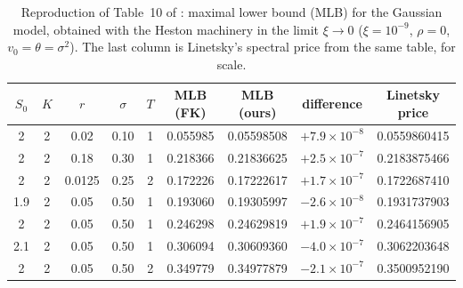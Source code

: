 \begin{table}[t]
\centering
\caption{Reproduction of Table~10 of \citet{FusaiKyriakou2016}: maximal lower bound (MLB) for the
Gaussian model, obtained with the Heston machinery in the limit $\xi\to0$ ($\xi=10^{-9}$, $\rho=0$,
$v_0=\theta=\sigma^2$). The last column is Linetsky's spectral price from the same table, for scale.}
\label{tab:fk10}
\footnotesize\setlength{\tabcolsep}{4.5pt}
\begin{tabular}{ccccc cccc}
\toprule
$S_0$ & $K$ & $r$ & $\sigma$ & $T$ & MLB (FK) & MLB (ours) & difference & Linetsky price\\
\midrule
2   & 2 & 0.02   & 0.10 & 1 & 0.055985 & 0.05598508 & $+7.9\times10^{-8}$ & 0.0559860415\\
2   & 2 & 0.18   & 0.30 & 1 & 0.218366 & 0.21836625 & $+2.5\times10^{-7}$ & 0.2183875466\\
2   & 2 & 0.0125 & 0.25 & 2 & 0.172226 & 0.17222617 & $+1.7\times10^{-7}$ & 0.1722687410\\
1.9 & 2 & 0.05   & 0.50 & 1 & 0.193060 & 0.19305997 & $-2.6\times10^{-8}$ & 0.1931737903\\
2   & 2 & 0.05   & 0.50 & 1 & 0.246298 & 0.24629819 & $+1.9\times10^{-7}$ & 0.2464156905\\
2.1 & 2 & 0.05   & 0.50 & 1 & 0.306094 & 0.30609360 & $-4.0\times10^{-7}$ & 0.3062203648\\
2   & 2 & 0.05   & 0.50 & 2 & 0.349779 & 0.34977879 & $-2.1\times10^{-7}$ & 0.3500952190\\
\bottomrule
\end{tabular}
\end{table}

